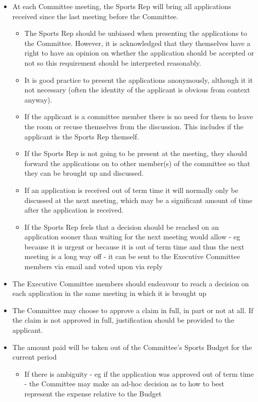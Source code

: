 \begin{itemize}
	\item At each Committee meeting, the Sports Rep will bring all applications received since the last meeting before the Committee.
	\begin{itemize}
		\item The Sports Rep should be unbiased when presenting the applications to the Committee. However, it is acknowledged that they themselves have a right to have an opinion on whether the application should be accepted or not so this requirement should be interpreted reasonably.
		\item It is good practice to present the applications anonymously, although it it not necessary (often the identity of the applicant is obvious from context anyway).
		\item If the applicant is a committee member there is no need for them to leave the room or recuse themselves from the discussion. This includes if the applicant is the Sports Rep themself.
		\item If the Sports Rep is not going to be present at the meeting, they should forward the applications on to other member(s) of the committee so that they can be brought up and discussed.
		\item If an application is received out of term time it will normally only be discussed at the next meeting, which may be a significant amount of time after the application is received. 
		\item If the Sports Rep feels that a decision should be reached on an application sooner than waiting for the next meeting would allow - eg because it is urgent or because it is out of term time and thus the next meeting is a long way off - it can be sent to the Executive Committee members via email and voted upon via reply
	\end{itemize}
	\item The Executive Committee members should endeavour to reach a decision on each application in the same meeting in which it is brought up
	\item The Committee may choose to approve a claim in full, in part or not at all. If the claim is not approved in full, justification should be provided to the applicant.
	\item The amount paid will be taken out of the Committee's Sports Budget for the current period
	\begin{itemize}
		\item If there is ambiguity - eg if the application was approved out of term time - the Committee may make an ad-hoc decision as to how to best represent the expense relative to the Budget

\end{itemize}
\end{itemize}
